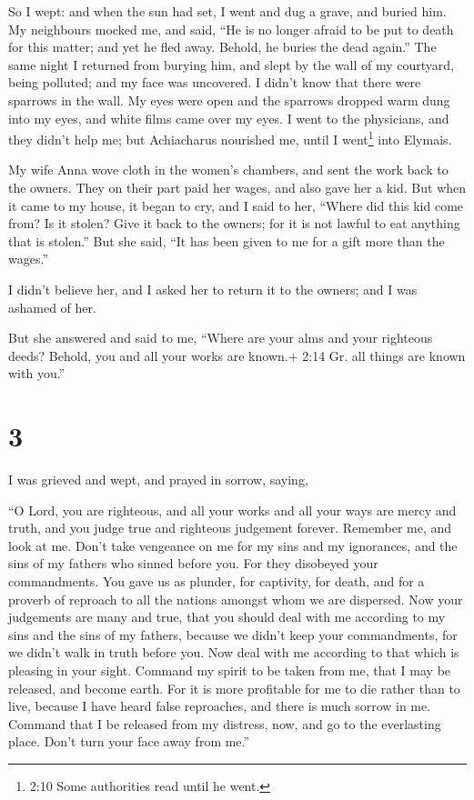  So I wept: and when the sun had set, I went and dug a
grave, and buried him.  My neighbours mocked me, and said,
``He is no longer afraid to be put to death for this matter; and yet he
fled away. Behold, he buries the dead again.''  The same
night I returned from burying him, and slept by the wall of my
courtyard, being polluted; and my face was uncovered.  I
didn't know that there were sparrows in the wall. My eyes were open and
the sparrows dropped warm dung into my eyes, and white films came over
my eyes. I went to the physicians, and they didn't help me; but
Achiacharus nourished me, until I went\footnote{2:10 Some authorities
  read until he went.} into Elymais.

 My wife Anna wove cloth in the women's chambers,
 and sent the work back to the owners. They on their part
paid her wages, and also gave her a kid.  But when it came
to my house, it began to cry, and I said to her, ``Where did this kid
come from? Is it stolen? Give it back to the owners; for it is not
lawful to eat anything that is stolen.''  But she said,
``It has been given to me for a gift more than the wages.''

I didn't believe her, and I asked her to return it to the owners; and I
was ashamed of her.

But she answered and said to me, ``Where are your alms and your
righteous deeds? Behold, you and all your works are known.+ 2:14 Gr. all
things are known with you.''

\hypertarget{section-2}{%
\section{3}\label{section-2}}

 I was grieved and wept, and prayed in sorrow, saying,

 ``O Lord, you are righteous, and all your works and all
your ways are mercy and truth, and you judge true and righteous
judgement forever.  Remember me, and look at me. Don't take
vengeance on me for my sins and my ignorances, and the sins of my
fathers who sinned before you.  For they disobeyed your
commandments. You gave us as plunder, for captivity, for death, and for
a proverb of reproach to all the nations amongst whom we are dispersed.
 Now your judgements are many and true, that you should deal
with me according to my sins and the sins of my fathers, because we
didn't keep your commandments, for we didn't walk in truth before you.
 Now deal with me according to that which is pleasing in
your sight. Command my spirit to be taken from me, that I may be
released, and become earth. For it is more profitable for me to die
rather than to live, because I have heard false reproaches, and there is
much sorrow in me. Command that I be released from my distress, now, and
go to the everlasting place. Don't turn your face away from me.''

